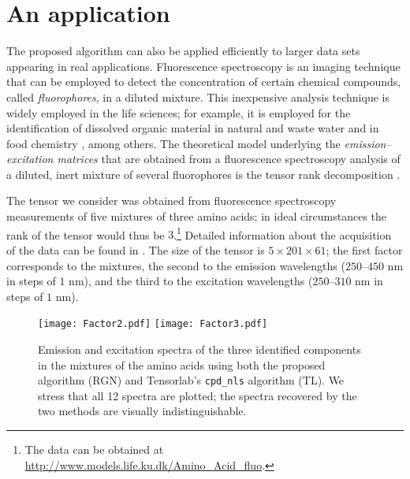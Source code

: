 \documentclass[a4paper,10pt,final]{siamart1116}
\numberwithin{equation}{section}
\numberwithin{figure}{section}
\numberwithin{table}{section}
\numberwithin{theorem}{section}
\begin{document}
\section{An application} \label{sec_application}
The proposed algorithm can also be applied efficiently to larger data sets appearing in real applications. Fluorescence spectroscopy is an imaging technique that can be employed to detect the concentration of certain chemical compounds, called \emph{fluorophores}, in a diluted mixture. This inexpensive analysis technique is widely employed in the life sciences; for example, it is employed for the identification of dissolved organic material in natural and waste water \cite{HBR2007} and in food chemistry \cite{SBG2004}, among others. The theoretical model underlying the \textit{emission--excitation matrices} that are obtained from a fluorescence spectroscopy analysis of a diluted, inert mixture of several fluorophores is the tensor rank decomposition \cite{AD1981}.

The tensor we consider was obtained from fluorescence spectroscopy measurements of five mixtures of three amino acids; in ideal circumstances the rank of the tensor would thus be $3$.\footnote{The data can be obtained at \url{http://www.models.life.ku.dk/Amino_Acid_fluo}.} Detailed information about the acquisition of the data can be found in \cite{Bro1998,Kiers1998}. The size of the tensor is $5 \times 201 \times 61$; the first factor corresponds to the mixtures, the second to the emission wavelengths ($250$--$450$ nm in steps of $1$ nm), and the third to the excitation wavelengths ($250$--$310$ nm in steps of $1$ nm).

\begin{figure}\centering\small
 \texttt{[image: Factor2.pdf]}
 \texttt{[image: Factor3.pdf]}
\caption{Emission and excitation spectra of the three identified components in the mixtures of the amino acids using both the proposed algorithm (RGN) and Tensorlab's \texttt{cpd\_nls} algorithm (TL). We stress that all 12 spectra are plotted; the spectra recovered by the two methods are visually indistinguishable.}
\label{fig_real_data}
\end{figure}
\end{document}
